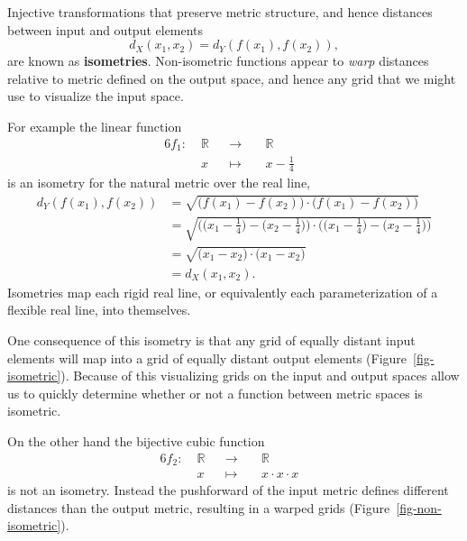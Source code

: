\documentclass[
  letterpaper,
  DIV=11,
  numbers=noendperiod]{scrartcl}
\begin{document}
Injective transformations that preserve metric structure, and hence
distances between input and output elements \[
d_X(x_1, x_2) = d_Y(f(x_1), f(x_2)),
\] are known as \textbf{isometries}. Non-isometric functions appear to
\emph{warp} distances relative to metric defined on the output space,
and hence any grid that we might use to visualize the input space.

For example the linear function \begin{alignat*}{6}
f_1 :\; & \mathbb{R} & &\rightarrow& \; & \mathbb{R} &
\\
& x & &\mapsto& & x - \frac{1}{4} &
\end{alignat*} is an isometry for the natural metric over the real line,
\begin{align*}
d_{Y}(f(x_1), f(x_2))
&=
\sqrt{ \big( f(x_{1}) - f(x_{2}) \big) \cdot \big( f(x_{1}) - f(x_{2}) \big) }
\\
&=
\sqrt{       \big( \big( x_{1} - \frac{1}{4} \big) - \big( x_{2} - \frac{1}{4} \big) \big)
       \cdot \big( \big( x_{1} - \frac{1}{4} \big) - \big( x_{2} - \frac{1}{4} \big) \big) }
\\
&=
\sqrt{ \big( x_{1} - x_{2} \big) \cdot \big( x_{1} - x_{2} \big) }
\\
&=
d_{X}(x_1, x_2).
\end{align*} Isometries map each rigid real line, or equivalently each
parameterization of a flexible real line, into themselves.

One consequence of this isometry is that any grid of equally distant
input elements will map into a grid of equally distant output elements
(Figure~\ref{fig-isometric}). Because of this visualizing grids on the
input and output spaces allow us to quickly determine whether or not a
function between metric spaces is isometric.

On the other hand the bijective cubic function \begin{alignat*}{6}
f_2 :\; & \mathbb{R} & &\rightarrow& \; & \mathbb{R} &
\\
& x & &\mapsto& & x \cdot x \cdot x &
\end{alignat*} is not an isometry. Instead the pushforward of the input
metric defines different distances than the output metric, resulting in
a warped grids (Figure~\ref{fig-non-isometric}).
\end{document}
